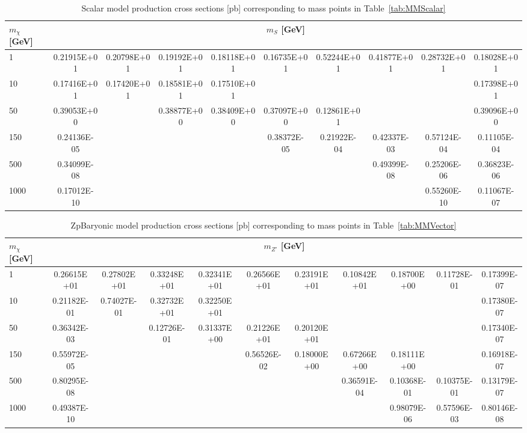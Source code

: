 \begin{table}
\begin{center}
\begin{tabular}{l | c | c | c | c | c | c | c | c | c}
\hline 
$m_\chi$ [GeV] & \multicolumn{9}{c}{$m_{S}$ [GeV]} \\ 
\hline
1 & 0.21915E+01 & 0.20798E+01 & 0.19192E+01 & 0.18118E+01 & 0.16735E+01 & 0.52244E+01 & 0.41877E+01 & 0.28732E+01 & 0.18028E+01\\
10 & 0.17416E+01 & 0.17420E+01 & 0.18581E+01 & 0.17510E+01 & & & & & 0.17398E+01\\
50 & 0.39053E+00 & & 0.38877E+00 & 0.38409E+00 & 0.37097E+00 & 0.12861E+01 & & & 0.39096E+00\\
150 & 0.24136E-05 & & & & 0.38372E-05 & 0.21922E-04 & 0.42337E-03 & 0.57124E-04 & 0.11105E-04\\
500 & 0.34099E-08 & & & & & & 0.49399E-08 & 0.25206E-06 & 0.36823E-06\\
1000 & 0.17012E-10 & & & & & & & 0.55260E-10 & 0.11067E-07\\
\hline
\end{tabular}
\caption{Scalar model production cross sections [pb] corresponding to mass points in Table~\ref{tab:MMScalar} \label{tab:scalarxsecs}}
\end{center}
\end{table}

\begin{table}
\begin{center}
\begin{tabular}{l | c | c | c | c | c | c | c | c | c | c}
\hline 
$m_\chi$ [GeV] & \multicolumn{10}{c}{$m_{Z'}$ [GeV]} \\ 
\hline
1 & 0.26615E+01 & 0.27802E+01 & 0.33248E+01 & 0.32341E+01 & 0.26566E+01 & 0.23191E+01 & 0.10842E+01 & 0.18700E+00 & 0.11728E-01 & 0.17399E-07\\
10 & 0.21182E-01 & 0.74027E-01 & 0.32732E+01 & 0.32250E+01 & & & & & & 0.17380E-07\\
50 & 0.36342E-03 & & 0.12726E-01 & 0.31337E+00  & 0.21226E+01 & 0.20120E+01 & & & & 0.17340E-07\\
150 & 0.55972E-05 & & & & 0.56526E-02 & 0.18000E+00 & 0.67266E+00 & 0.18111E+00 & & 0.16918E-07\\
500 & 0.80295E-08 & & & & & & 0.36591E-04 & 0.10368E-01 & 0.10375E-01 & 0.13179E-07\\
1000 & 0.49387E-10 & & & & & & & 0.98079E-06 & 0.57596E-03 & 0.80146E-08\\
\hline
\end{tabular}
\caption{ZpBaryonic model production cross sections [pb] corresponding to mass points in Table~\ref{tab:MMVector} \label{tab:zpbaryonicxsecs}}
\end{center}
\end{table}

